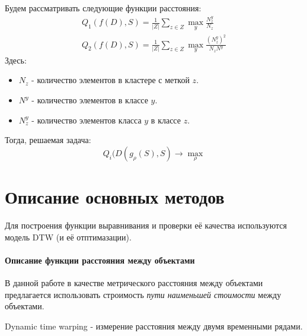 \documentclass[12pt,twoside]{article}
\begin{document}
        Будем рассматривать следующие функции расстояния:
        \begin{align*}
            Q_1(f(D), S) = \frac{1}{|Z|}\sum\limits_{z \in Z} \max_y \frac{N_z^y}{N_z}  \\
            Q_2(f(D), S) = \frac{1}{|Z|}\sum\limits_{z \in Z} \max_y \frac{(N_z^y)^2}{N_z N^y}
        \end{align*}
        Здесь: 
        \begin{itemize}[label=$\bullet$]
            \item $N_z$ \-- количество элементов в кластере с меткой $z$. 
            \item $N^y$ \-- количество элементов в классе $y$.
            \item $N_z^y$ \-- количество элементов класса $y$ в классе $z$.
        \end{itemize}

        Тогда, решаемая задача:
        $$
            Q_i(D(g_\rho(S), S) \rightarrow \max_{\rho}
        $$

				
    \section{Описание основных методов}
        
        Для построения функции выравнивания и проверки её качества используются модель DTW (и её отптимазации).
            
        \paragraph{Описание функции расстояния между объектами}

            В данной работе в качестве метрического расстояния между объектами предлагается использовать 
            строимость \textit{пути наименьшей стоимости} между объектами.
            
            Dynamic time warping - измерение расстояния между двумя временными рядами.
            
\end{document}
